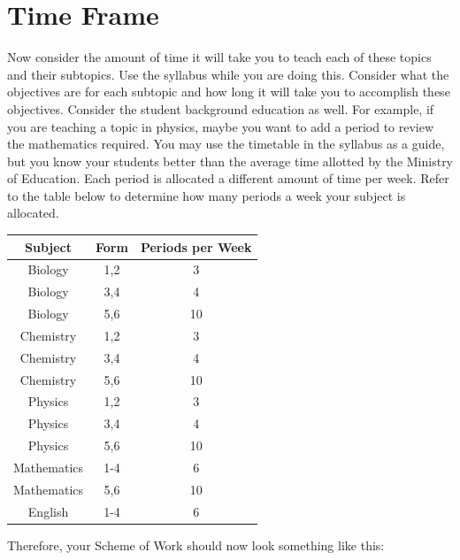 \section{Time Frame}
Now consider the amount of time it will take you to teach each of these topics and their subtopics. Use the syllabus while you are doing this.  Consider what the objectives are for each subtopic and how long it will take you to accomplish these objectives.  Consider the student background education as well.  For example, if you are teaching a topic in physics, maybe you want to add a period to review the mathematics required.  You may use the timetable in the syllabus as a guide, but you know your students better than the average time allotted by the Ministry of Education.  Each period is allocated a different amount of time per week.  Refer to the table below to determine how many periods a week your subject is allocated.\\

\begin{center}

\begin{tabular}{|c|c|c|}
\hline \rule[-2ex]{0pt}{5.5ex} Subject & Form & Periods per Week \\ 
\hline \rule[-2ex]{0pt}{5.5ex} Biology & 1,2 & 3 \\ 
\hline \rule[-2ex]{0pt}{5.5ex} Biology & 3,4 & 4 \\ 
\hline \rule[-2ex]{0pt}{5.5ex} Biology & 5,6 & 10 \\ 
\hline \rule[-2ex]{0pt}{5.5ex} Chemistry & 1,2 & 3 \\ 
\hline \rule[-2ex]{0pt}{5.5ex} Chemistry & 3,4  & 4 \\ 
\hline \rule[-2ex]{0pt}{5.5ex} Chemistry & 5,6 & 10 \\ 
\hline \rule[-2ex]{0pt}{5.5ex} Physics & 1,2 & 3 \\ 
\hline \rule[-2ex]{0pt}{5.5ex} Physics & 3,4 & 4 \\ 
\hline \rule[-2ex]{0pt}{5.5ex} Physics & 5,6 & 10 \\ 
\hline \rule[-2ex]{0pt}{5.5ex} Mathematics & 1-4 & 6 \\ 
\hline \rule[-2ex]{0pt}{5.5ex} Mathematics & 5,6  & 10 \\ 
\hline \rule[-2ex]{0pt}{5.5ex} English & 1-4 & 6 \\ 
\hline 
\end{tabular} 

\end{center}
Therefore, your Scheme of Work should now look something like this:

